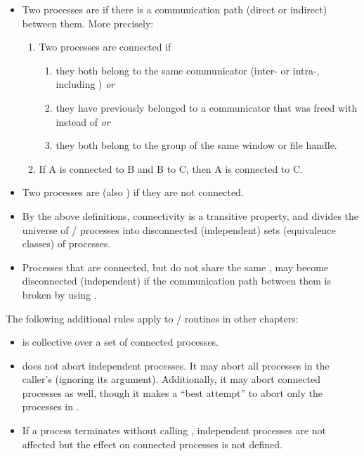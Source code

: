 \begin{itemize}
\item Two processes are  if there is a
communication path (direct or indirect) between them. More precisely:
  \begin{enumerate}
  \item Two processes are connected if
  \begin{enumerate}
    \item they both belong
      to the same communicator (inter- or intra-,
      including ) \emph{or}
    \item they have previously belonged to a communicator
      that was freed with  instead
      of  \emph{or}
    \item they both belong to the group of the same window or
      file handle.
  \end{enumerate}
  \item If A is connected to B and B to C, then A is connected to C.
  \end{enumerate}
\item Two processes are  (also )
if they are not connected.
\item By the above definitions, connectivity is a transitive
property, and divides the universe of \MPI/ processes into
disconnected (independent) sets (equivalence classes) of processes.
\item Processes that are connected, but do not share the same
, may become disconnected (independent) if the
communication path between them is broken by
using .
\end{itemize}

The following additional rules apply to
\MPI/ routines in other chapters:
\begin{itemize}
\item {} is collective over a set of
connected processes.
\item {} does not abort independent processes.
It may abort all processes in the caller's
 (ignoring its 
argument). Additionally, it may abort connected processes
as well, though it makes a ``best attempt'' to abort only
the processes in .
\item If a process terminates without calling ,
independent processes are not affected but the effect on
connected processes is not defined.
\end{itemize}

